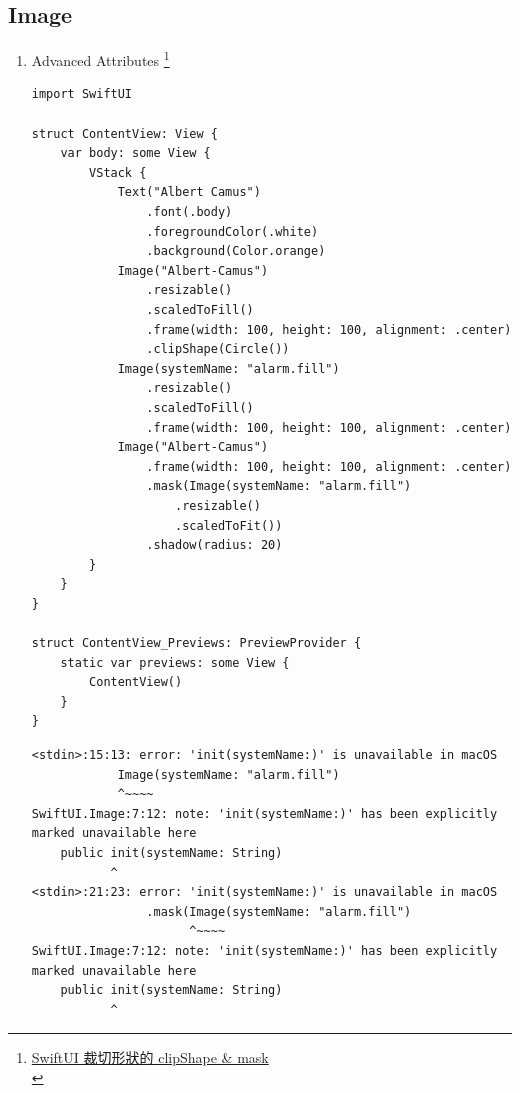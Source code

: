\documentclass[a4paper,12pt]{article}
\begin{document}
\subsection{Image}
\label{sec:orga1d9ac2}
\begin{enumerate}
\item Advanced Attributes \footnote{\href{https://medium.com/\%E5\%BD\%BC\%E5\%BE\%97\%E6\%BD\%98\%E7\%9A\%84-swift-ios-app-\%E9\%96\%8B\%E7\%99\%BC\%E5\%95\%8F\%E9\%A1\%8C\%E8\%A7\%A3\%E7\%AD\%94\%E9\%9B\%86/swiftui-\%E8\%A3\%81\%E5\%88\%87\%E5\%BD\%A2\%E7\%8B\%80\%E7\%9A\%84-clipshape-mask-4fc49b34141}{SwiftUI 裁切形狀的 clipShape \& mask}\\}
\label{sec:org0b81f33}
\lstset{breaklines=true,language=swift,label= ,caption= ,captionpos=b,firstnumber=1,numbers=left}
\begin{lstlisting}
import SwiftUI

struct ContentView: View {
    var body: some View {
        VStack {
            Text("Albert Camus")
                .font(.body)
                .foregroundColor(.white)
                .background(Color.orange)
            Image("Albert-Camus")
                .resizable()
                .scaledToFill()
                .frame(width: 100, height: 100, alignment: .center)
                .clipShape(Circle())
            Image(systemName: "alarm.fill")
                .resizable()
                .scaledToFill()
                .frame(width: 100, height: 100, alignment: .center)
            Image("Albert-Camus")
                .frame(width: 100, height: 100, alignment: .center)
                .mask(Image(systemName: "alarm.fill")
                    .resizable()
                    .scaledToFit())
                .shadow(radius: 20)
        }
    }
}

struct ContentView_Previews: PreviewProvider {
    static var previews: some View {
        ContentView()
    }
}

\end{lstlisting}

\begin{verbatim}
<stdin>:15:13: error: 'init(systemName:)' is unavailable in macOS
            Image(systemName: "alarm.fill")
            ^~~~~
SwiftUI.Image:7:12: note: 'init(systemName:)' has been explicitly marked unavailable here
    public init(systemName: String)
           ^
<stdin>:21:23: error: 'init(systemName:)' is unavailable in macOS
                .mask(Image(systemName: "alarm.fill")
                      ^~~~~
SwiftUI.Image:7:12: note: 'init(systemName:)' has been explicitly marked unavailable here
    public init(systemName: String)
           ^
\end{verbatim}


\end{enumerate}
\end{document}
